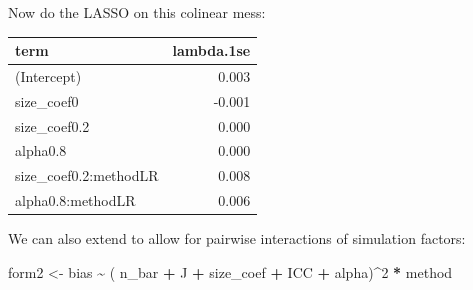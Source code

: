 \documentclass[
]{book}
\newenvironment{Shaded}{\begin{snugshade}}{\end{snugshade}}
\newcommand{\AttributeTok}[1]{\textcolor[rgb]{0.13,0.29,0.53}{#1}}
\newcommand{\DecValTok}[1]{\textcolor[rgb]{0.00,0.00,0.81}{#1}}
\newcommand{\FloatTok}[1]{\textcolor[rgb]{0.00,0.00,0.81}{#1}}
\newcommand{\FunctionTok}[1]{\textcolor[rgb]{0.13,0.29,0.53}{\textbf{#1}}}
\newcommand{\NormalTok}[1]{#1}
\newcommand{\OtherTok}[1]{\textcolor[rgb]{0.56,0.35,0.01}{#1}}
\newcommand{\SpecialCharTok}[1]{\textcolor[rgb]{0.81,0.36,0.00}{\textbf{#1}}}
\newcommand{\StringTok}[1]{\textcolor[rgb]{0.31,0.60,0.02}{#1}}
\begin{document}
Now do the LASSO on this colinear mess:

\begin{Shaded}
\end{Shaded}

\begin{tabular}{l|r}
\hline
term & lambda.1se\\
\hline
(Intercept) & 0.003\\
\hline
size\_coef0 & -0.001\\
\hline
size\_coef0.2 & 0.000\\
\hline
alpha0.8 & 0.000\\
\hline
size\_coef0.2:methodLR & 0.008\\
\hline
alpha0.8:methodLR & 0.006\\
\hline
\end{tabular}

We can also extend to allow for pairwise interactions of simulation factors:

\begin{Shaded}
\begin{Highlighting}[]
\NormalTok{form2 }\OtherTok{\textless{}{-}}\NormalTok{ bias }\SpecialCharTok{\textasciitilde{}}\NormalTok{ ( n\_bar }\SpecialCharTok{+}\NormalTok{ J }\SpecialCharTok{+}\NormalTok{ size\_coef }\SpecialCharTok{+}\NormalTok{ ICC }\SpecialCharTok{+}\NormalTok{ alpha)}\SpecialCharTok{\^{}}\DecValTok{2} \SpecialCharTok{*}\NormalTok{ method}
\end{Highlighting}
\end{Shaded}
\end{document}
